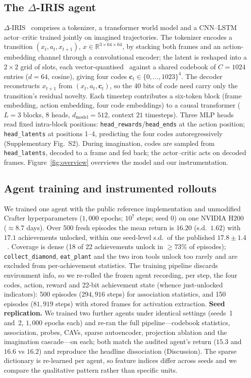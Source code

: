 \documentclass[pdflatex,sn-mathphys-num]{sn-jnl}%
\theoremstyle{thmstyleone}%
\theoremstyle{thmstyletwo}%
\theoremstyle{thmstylethree}%
\newcommand{\deltairis}{$\Delta$-IRIS}
\newcommand{\achname}[1]{\texttt{#1}}
\begin{document}
\subsection{The \deltairis{} agent}\label{m:agent}
\deltairis{}~\cite{deltairis2024} comprises a tokenizer, a transformer world model and a CNN--LSTM actor--critic trained jointly on imagined trajectories. The tokenizer encodes a transition $(x_t,a_t,x_{t+1})$, $x\in\mathbb{R}^{3\times64\times64}$, by stacking both frames and an action-embedding channel through a convolutional encoder; the latent is reshaped into a $2\times2$ grid of slots, each vector-quantised~\cite{vqvae2017} against a shared codebook of $C{=}1024$ entries ($d{=}64$, cosine), giving four codes $\mathbf{c}_t\in\{0,\dots,1023\}^4$. The decoder reconstructs $x_{t+1}$ from $(x_t,a_t,\mathbf{c}_t)$, so the $40$ bits of code need carry only the transition's residual novelty. Each timestep contributes a six-token block (frame embedding, action embedding, four code embeddings) to a causal transformer ($L{=}3$ blocks, 8 heads, $d_{\mathrm{model}}{=}512$, context $21$ timesteps). Three MLP heads read fixed intra-block positions: \texttt{head\_rewards}/\texttt{head\_ends} at the action position; \texttt{head\_latents} at positions 1--4, predicting the four codes autoregressively (Supplementary Fig.~S2). During imagination, codes are sampled from \texttt{head\_latents}, decoded to a frame and fed back; the actor--critic acts on decoded frames. Figure~\ref{fig:overview} overviews the model and our instrumentation.

\subsection{Agent training and instrumented rollouts}\label{m:train}
We trained one agent with the public reference implementation and unmodified Crafter hyperparameters ($1{,}000$ epochs; $10^7$ steps; seed 0) on one NVIDIA H200 ($\approx 8.7$ days). Over 500 fresh episodes the mean return is $16.20$ (s.d.\ $1.62$) with $17.1$ achievements unlocked, within one seed-level s.d.\ of the published $17.8\pm1.4$~\cite{deltairis2024}. Coverage is dense (18 of 22 achievements unlock in $\ge 73\%$ of episodes); \achname{collect\_diamond}, \achname{eat\_plant} and the two iron tools unlock too rarely and are excluded from per-achievement statistics. The training pipeline discards environment info, so we re-rolled the frozen agent recording, per step, the four codes, action, reward and 22-bit achievement state (whence just-unlocked indicators): 500 episodes ($294{,}916$ steps) for association statistics, and 150 episodes ($81{,}919$ steps) with stored frames for activation extraction. \textbf{Seed replication.} We trained two further agents under identical settings (seeds~1 and~2, $1{,}000$ epochs each) and re-ran the full pipeline---codebook statistics, association, probes, CAVs, sparse autoencoder, projection ablation and the imagination cascade---on each; both match the audited agent's return ($15.3$ and $16.6$ vs $16.2$) and reproduce the headline dissociation (Discussion). The sparse dictionary is re-learned per agent, so feature indices differ across seeds and we compare the qualitative pattern rather than specific units.
\end{document}
